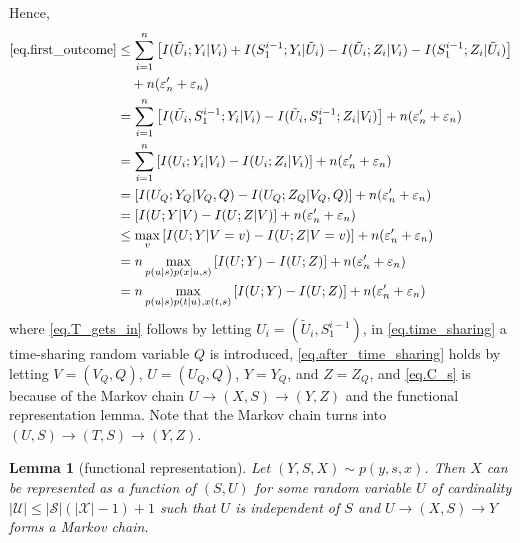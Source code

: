 \documentclass[12pt, Draft, onecolumn]{IEEEtran}
\def\calS{{\mathcal{S}}}
\def\calU{{\mathcal{U}}}
\def\calX{{\mathcal{X}}}
\newtheorem{lemma}{Lemma}
\begin{document}
Hence,
\begin{align}
\eqref{eq.first_outcome}&\leq \sum_{i=1}^n \left[I(\tilde{U}_i;Y_i|V_i)+I(S_1^{i-1};Y_i|\tilde{U}_i)-I(\tilde{U}_i;Z_i|V_i)-I(S_1^{i-1};Z_i|\tilde{U}_i)\right]\notag\\
&\quad+n(\varepsilon_n'+\varepsilon_n)\notag\\
&=\sum_{i=1}^n \left[I(\tilde{U}_i,S_1^{i-1};Y_i|V_i)-I(\tilde{U}_i,S_1^{i-1};Z_i|V_i)\right]+n(\varepsilon_n'+\varepsilon_n)\notag\\
\label{eq.T_gets_in}
&= \sum_{i=1}^n \left[I(U_i;Y_i|V_i)-I(U_i;Z_i|V_i)\right]+n(\varepsilon_n'+\varepsilon_n)\\
\label{eq.time_sharing}
&= \left[I(U_Q;Y_Q|V_Q,Q)-I(U_Q;Z_Q|V_Q,Q)\right]+n(\varepsilon_n'+\varepsilon_n)\\
\label{eq.after_time_sharing}
&= \left[I(U;Y|V)-I(U;Z|V)\right]+n(\varepsilon_n'+\varepsilon_n)\\
&\leq \max_v \left[I(U;Y|V=v)-I(U;Z|V=v)\right]+n(\varepsilon_n'+\varepsilon_n)\notag\\
\label{eq.C_s}
&= n\max_{p(u|s)p(x|u,s)}\left[I(U;Y)-I(U;Z)\right]+n(\varepsilon_n'+\varepsilon_n)\notag\\
&= n\max_{p(u|s)p(t|u),x(t,s)}\left[I(U;Y)-I(U;Z)\right]+n(\varepsilon_n'+\varepsilon_n)
\end{align}
where \eqref{eq.T_gets_in} follows by letting $U_i=(\tilde{U}_i,S_1^{i-1})$, in \eqref{eq.time_sharing} a time-sharing random variable $Q$ is introduced, \eqref{eq.after_time_sharing} holds by letting $V = (V_Q,Q)$, $U=(U_Q,Q)$, $Y=Y_Q$, and $Z=Z_Q$, and \eqref{eq.C_s} is because of the Markov chain $U\rightarrow (X,S)\rightarrow (Y,Z)$ and the functional representation lemma. Note that the Markov chain turns into $(U,S)\rightarrow (T,S)\rightarrow(Y,Z)$.

\begin{lemma}[functional representation]
Let $(Y,S,X)\sim p(y,s,x)$. Then $X$ can be represented as a function of $(S,U)$ for some random variable $U$ of cardinality $|\calU|\leq |\calS|(|\calX|-1)+1$ such that $U$ is independent of $S$ and $U\rightarrow (X,S)\rightarrow Y$ forms a Markov chain.
\end{lemma}




%
%
\end{document}
